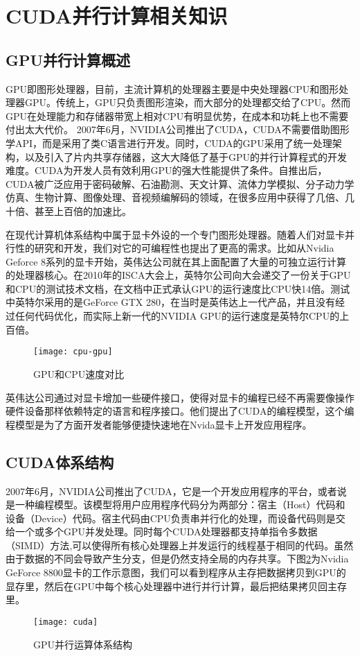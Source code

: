 \section{CUDA并行计算相关知识}
\subsection{GPU并行计算概述}
GPU即图形处理器，目前，主流计算机的处理器主要是中央处理器CPU和图形处理器GPU。传统上，GPU只负责图形渲染，而大部分的处理都交给了CPU。然而GPU在处理能力和存储器带宽上相对CPU有明显优势，在成本和功耗上也不需要付出太大代价。
2007年6月，NVIDIA公司推出了CUDA，CUDA不需要借助图形学API，而是采用了类C语言进行开发。同时，CUDA的GPU采用了统一处理架构，以及引入了片内共享存储器，这大大降低了基于GPU的并行计算程式的开发难度。CUDA为开发人员有效利用GPU的强大性能提供了条件。自推出后，CUDA被广泛应用于密码破解、石油勘测、天文计算、流体力学模拟、分子动力学仿真、生物计算、图像处理、音视频编解码的领域，在很多应用中获得了几倍、几十倍、甚至上百倍的加速比。

在现代计算机体系结构中属于显卡外设的一个专门图形处理器。随着人们对显卡并行性的研究和开发，我们对它的可编程性也提出了更高的需求。比如从Nvidia Geforce 8系列的显卡开始，英伟达公司就在其上面配置了大量的可独立运行计算的处理器核心。在2010年的ISCA大会上，英特尔公司向大会递交了一份关于GPU和CPU的测试技术文档，在文档中正式承认GPU的运行速度比CPU快14倍\cite{intel}。测试中英特尔采用的是GeForce GTX 280，在当时是英伟达上一代产品，并且没有经过任何代码优化，而实际上新一代的NVIDIA GPU的运行速度是英特尔CPU的上百倍。
\begin{figure}[!ht]
\centering
\texttt{[image: cpu-gpu]}
\caption{GPU和CPU速度对比}
\label{fig:2.1}
\end{figure}

英伟达公司通过对显卡增加一些硬件接口，使得对显卡的编程已经不再需要像操作硬件设备那样依赖特定的语言和程序接口。他们提出了CUDA的编程模型，这个编程模型是为了方面开发者能够便捷快速地在Nvida显卡上开发应用程序。
\subsection{CUDA体系结构}
2007年6月，NVIDIA公司推出了CUDA\cite{nvidia}，它是一个开发应用程序的平台，或者说是一种编程模型。该模型将用户应用程序代码分为两部分：宿主（Host）代码和设备（Device）代码。宿主代码由CPU负责串并行化的处理，而设备代码则是交给一个或多个GPU并发处理。同时每个CUDA处理器都支持单指令多数据（SIMD）方法\cite{nb},可以使得所有核心处理器上并发运行的线程基于相同的代码。虽然由于数据的不同会导致产生分支，但是仍然支持全局的内存共享。下图\ref{fig:2.2}为Nvidia GeForce 8800显卡的工作示意图，我们可以看到程序从主存把数据拷贝到GPU的显存里，然后在GPU中每个核心处理器中进行并行计算，最后把结果拷贝回主存里。
\begin{figure}[!ht]
\centering
\texttt{[image: cuda]}
\caption{GPU并行运算体系结构}
\label{fig:2.2}
\end{figure}

